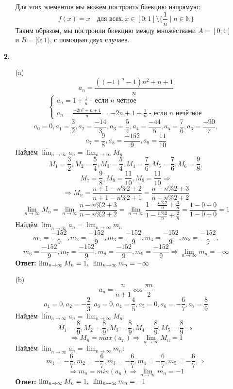 \documentclass[a4paper]{article}
\renewcommand{\f}[2]{\frac{#1}{#2}}
\newcommand{\case}[1]{\begin{cases} #1 \end{cases}}
\newcommand{\ts}{\text{\space}}
\renewcommand{\r}{\Rightarrow}
\begin{document}
\begin{enumerate}
\begin{enumerate}
        Для этих элементов мы можем построить биекцию напрямую:
        $$f(x) = x \quad \text{для всех} , x \in [0;1] \setminus \{ \frac{1}{n} \mid n \in \mathbb{N} \}$$
        Таким образом, мы построили биекцию между множествами $A = [0;1]$ и $B = [0;1)$, с помощью двух случаев.
    \end{enumerate}

    \item[\textbf{2.}]
    \begin{enumerate}
        \item[(a)] 
        $$a_n = \f{((-1)^n - 1)n^2 +n + 1}{n}$$
        $$\case{
            a_n = 1 + \f{1}{n} \text{ - если $n$ чётное}\\
            a_n = \f{-2n^2+n+1}{n} = -2n+1 + \f{1}{n} \text{ - если $n$ нечётное}
        }$$
        $$a_0 = 0, a_1 = \frac{3}{2}, a_2 = \frac{-14}{3}, a_3 = \frac{5}{4}, a_4 = \frac{-44}{5}, a_5 = \frac{7}{6}, a_6 = \frac{-90}{7},$$
        $$a_7 = \frac{9}{8}, a_8 = \frac{-152}{9}, a_9 = \frac{11}{10} $$
        Найдём $\overline{\lim}_{n \to \infty} a_n= \lim_{n \to \infty} M_n$
        $$M_1 = \frac{3}{2}, M_2 = \frac{5}{4}, M_3 = \frac{5}{4}, M_4 = \frac{7}{6}, M_5 = \frac{7}{6}, M_6 = \frac{9}{8},$$ 
        $$M_7 = \frac{9}{8}, M_8 = \frac{11}{10}, M_9 = \frac{11}{10} \r$$
        $$\r M_n = \f{n+1-n\%2+2}{n+1-n\%2+1} = \f{n-n\%2+3}{n-n\%2+2}$$
        $$\lim_{n \to \infty} M_n =\lim_{n \to \infty} \f{n-n\%2+3}{n-n\%2+2} = \lim_{n \to \infty}\f{1-\f{n\%2}{n}+\f{3}{n}}{1-\f{n\%2}{n}+\f{2}{n}} = \f{1-0+0}{1-0+0} = 1$$
        Найдём $\underline{\lim}_{n \to \infty} a_n= \lim_{n \to \infty} m_n$
        $$m_1 = \frac{-152}{9}, m_2 = \frac{-152}{9}, m_3 = \frac{-152}{9}, m_4 = \frac{-152}{9}, m_5 = \frac{-152}{9},$$ $$m_6 = \frac{-152}{9},
        m_7 = \frac{-152}{9}, m_8 = \frac{-152}{9}, m_9 = \frac{-152}{9} \r \lim_{n \to \infty} m_n = -\infty$$
        \textbf{Ответ: } $\lim_{n \to \infty} M_n = 1, \ts \lim_{n \to \infty} m_n = -\infty$
        
        \item[(b)]$$a_n = \f{n}{n+1}\cos\f{\pi n}{2}$$
        $$ a_1 = 0, a_2 = -\frac{2}{3}, a_3 = 0, a_4 = \frac{4}{5}, a_5 = 0, a_6 = -\frac{6}{7}, a_7 = \f{8}{9}$$
        Найдём $\overline{\lim}_{n \to \infty} a_n= \lim_{n \to \infty} M_n$:
        $$M_1 = \f{8}{9}, M_2 = \f{8}{9}, M_3 = \f{8}{9}, M_4 = \f{8}{9}, M_5 = \f{8}{9} \r $$
        $$\r M_n = max(a_n) \r \lim_{n \to \infty} M_n = 1$$
        Найдём $\underline{\lim}_{n \to \infty} a_n= \lim_{n \to \infty} m_n$:
        $$m_1 = -\f{6}{7}, m_2 = -\f{6}{7}, m_3 = -\f{6}{7}, m_4 = -\f{6}{7}, m_5 = -\f{6}{7} \r$$
        $$\r m_n = min(a_n) \r \lim_{n \to \infty} m_n = -1$$
        \textbf{Ответ: } $\lim_{n \to \infty} M_n = 1, \ts \lim_{n \to \infty} m_n = -1$


\end{enumerate}
\end{enumerate}
\end{document}
